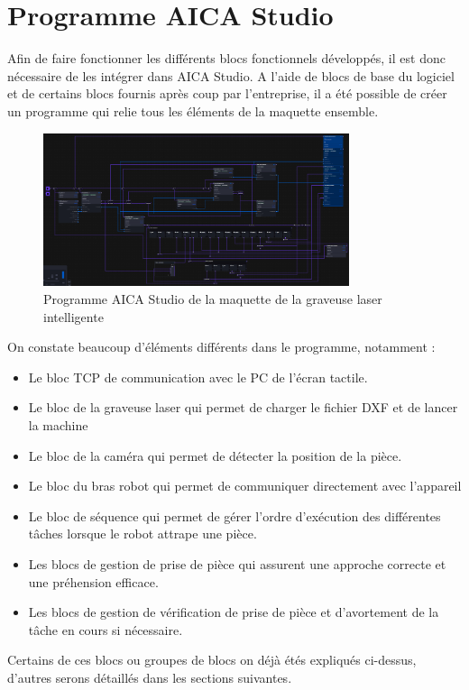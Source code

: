 \section{Programme AICA Studio}
Afin de faire fonctionner les différents blocs fonctionnels développés, il est donc nécessaire de les intégrer dans AICA Studio. A l'aide de blocs de base du logiciel et de certains blocs fournis après coup par l'entreprise, il a été possible de créer un programme qui relie tous les éléments de la maquette ensemble.
\begin{figure}[H]
    \centering
    \includegraphics[width=0.8\textwidth]{assets/figures/AICA_PROG.png}
    \caption{Programme AICA Studio de la maquette de la graveuse laser intelligente}
    \label{fig:aica_programme}
\end{figure}

On constate beaucoup d'éléments différents dans le programme, notamment :
\begin{itemize}
    \item Le bloc TCP de communication avec le PC de l'écran tactile.
    \item Le bloc de la graveuse laser qui permet de charger le fichier DXF et de lancer la machine
    \item Le bloc de la caméra qui permet de détecter la position de la pièce.
    \item Le bloc du bras robot qui permet de communiquer directement avec l'appareil
    \item Le bloc de séquence qui permet de gérer l'ordre d'exécution des différentes tâches lorsque le robot attrape une pièce.
    \item Les blocs de gestion de prise de pièce qui assurent une approche correcte et une préhension efficace.
    \item Les blocs de gestion de vérification de prise de pièce et d'avortement de la tâche en cours si nécessaire.
\end{itemize}

Certains de ces blocs ou groupes de blocs on déjà étés expliqués ci-dessus, d'autres serons détaillés dans les sections suivantes.

